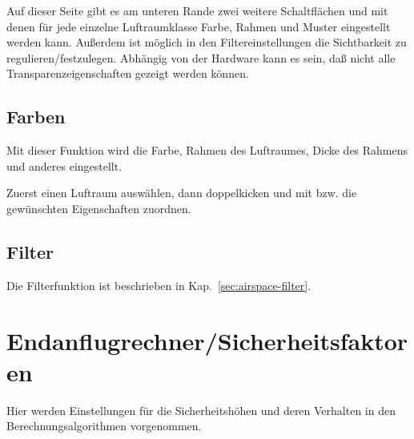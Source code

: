 Auf dieser Seite gibt es am unteren Rande zwei weitere Schaltflächen   und
  mit denen für jede einzelne Luftraumklasse Farbe, Rahmen und Muster
 eingestellt werden kann.
 Außerdem ist möglich in den Filtereinstellungen die Sichtbarkeit zu regulieren/festzulegen.
Abhängig von der Hardware kann es sein, daß nicht alle Transparenzeigenschaften gezeigt
werden können.

\subsection*{Farben}
Mit dieser Funktion wird die Farbe, Rahmen des Luftraumes,  Dicke des Rahmens und
anderes eingestellt.

Zuerst einen Luftraum auswählen, dann doppelkicken und mit   bzw.
 die gewünschten Eigenschaften zuordnen.

\subsection*{Filter}
Die Filterfunktion ist beschrieben in Kap.~\ref{sec:airspace-filter}.


\section{Endanflugrechner/Sicherheitsfaktoren}
Hier werden Einstellungen für die Sicherheitshöhen und deren Verhalten in den Berechnungsalgorithmen vorgenommen.

